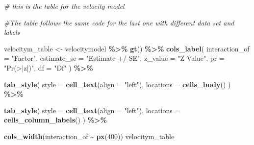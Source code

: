 \documentclass[
]{article}
\newenvironment{Shaded}{\begin{snugshade}}{\end{snugshade}}
\newcommand{\AttributeTok}[1]{\textcolor[rgb]{0.13,0.29,0.53}{#1}}
\newcommand{\CommentTok}[1]{\textcolor[rgb]{0.56,0.35,0.01}{\textit{#1}}}
\newcommand{\DecValTok}[1]{\textcolor[rgb]{0.00,0.00,0.81}{#1}}
\newcommand{\FunctionTok}[1]{\textcolor[rgb]{0.13,0.29,0.53}{\textbf{#1}}}
\newcommand{\NormalTok}[1]{#1}
\newcommand{\OtherTok}[1]{\textcolor[rgb]{0.56,0.35,0.01}{#1}}
\newcommand{\SpecialCharTok}[1]{\textcolor[rgb]{0.81,0.36,0.00}{\textbf{#1}}}
\newcommand{\StringTok}[1]{\textcolor[rgb]{0.31,0.60,0.02}{#1}}
\begin{document}
\begin{Shaded}
\begin{Highlighting}[]
\CommentTok{\# this is the table for the velocity model}

\CommentTok{\#The table follows the same code for the last one with different data set and labels}

\NormalTok{velocitym\_table }\OtherTok{\textless{}{-}}\NormalTok{ velocitymodel }\SpecialCharTok{\%\textgreater{}\%}
  \FunctionTok{gt}\NormalTok{() }\SpecialCharTok{\%\textgreater{}\%}
  \FunctionTok{cols\_label}\NormalTok{(}
    \AttributeTok{interaction\_of =} \StringTok{"Factor"}\NormalTok{,  }
    \AttributeTok{estimate\_se =} \StringTok{"Estimate +/{-}SE"}\NormalTok{,          }
    \AttributeTok{z\_value =} \StringTok{"Z Value"}\NormalTok{,}
    \AttributeTok{pr =} \StringTok{"Pr(\textgreater{}|z|)"}\NormalTok{,}
    \AttributeTok{df =} \StringTok{"Df"}
\NormalTok{  ) }\SpecialCharTok{\%\textgreater{}\%}

  \FunctionTok{tab\_style}\NormalTok{(}
    \AttributeTok{style =} \FunctionTok{cell\_text}\NormalTok{(}\AttributeTok{align =} \StringTok{"left"}\NormalTok{),}
    \AttributeTok{locations =} \FunctionTok{cells\_body}\NormalTok{()}
\NormalTok{  ) }\SpecialCharTok{\%\textgreater{}\%}

  \FunctionTok{tab\_style}\NormalTok{(}
    \AttributeTok{style =} \FunctionTok{cell\_text}\NormalTok{(}\AttributeTok{align =} \StringTok{"left"}\NormalTok{),}
    \AttributeTok{locations =} \FunctionTok{cells\_column\_labels}\NormalTok{()}
\NormalTok{  ) }\SpecialCharTok{\%\textgreater{}\%}
  
  \FunctionTok{cols\_width}\NormalTok{(interaction\_of }\SpecialCharTok{\textasciitilde{}} \FunctionTok{px}\NormalTok{(}\DecValTok{400}\NormalTok{))}
\NormalTok{velocitym\_table}
\end{Highlighting}
\end{Shaded}
\end{document}
